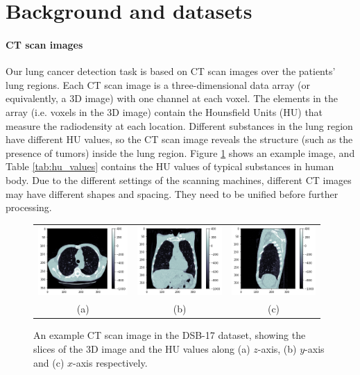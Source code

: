 \documentclass{article}
\begin{document}
\section{Background and datasets}
\label{sec:background}

\paragraph{CT scan images}
Our lung cancer detection task is based on CT scan images over the patients' lung regions. Each CT scan image is a three-dimensional data array (or equivalently, a 3D image) with one channel at each voxel. The elements in the array (i.e. voxels in the 3D image) contain the Hounsfield Units (HU) that measure the radiodensity at each location. Different substances in the lung region have different HU values, so the CT scan image reveals the structure (such as the presence of tumors) inside the lung region. Figure \ref{fig:ct_scan} shows an example image, and Table \ref{tab:hu_values} contains the HU values of typical substances in human body. Due to the different settings of the scanning machines, different CT images may have different shapes and spacing. They need to be unified before further processing.

\begin{figure}[t]
  \centering
  \begin{tabular}{ccc}
  \includegraphics[height=100px]{figures/dsb17_1.png} &
  \includegraphics[height=100px]{figures/dsb17_2.png} &
  \includegraphics[height=100px]{figures/dsb17_3.png} \\
  (a) & (b) & (c) \\
  \end{tabular}
  \caption{An example CT scan image in the DSB-17 dataset, showing the slices of the 3D image and the HU values along (a) $z$-axis, (b) $y$-axis and (c) $x$-axis respectively.}
  \label{fig:ct_scan}
\end{figure}
\end{document}
